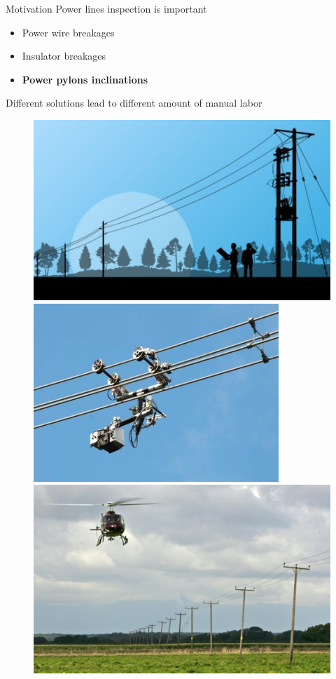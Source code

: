 \documentclass{beamer}
\begin{document}
\begin{frame}[t, fragile]{Motivation}
Power lines inspection is important
\begin{itemize}
\item Power wire breakages
\item Insulator  breakages
\item \textbf{Power pylons inclinations}
\end{itemize}

Different solutions lead to different amount of manual labor\\
\begin{figure}
\includegraphics[scale=0.23]{inspection_people}
  \hspace{0.1cm}
\includegraphics[scale=0.26]{inspection_robot}
  \hspace{0.1cm}
\includegraphics[scale=0.22]{inspection_helicopter}
\end{figure}
\end{frame}
\end{document}
